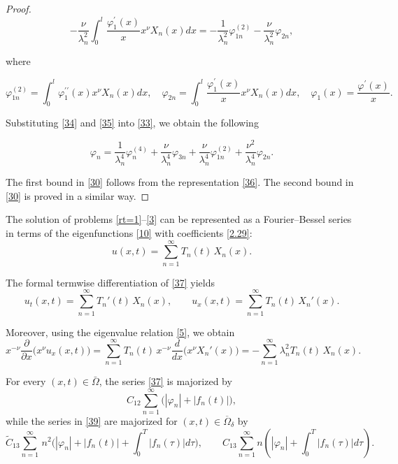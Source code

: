 \documentclass[reqno]{amsart}
\theoremstyle{definition}
\numberwithin{equation}{section}
\begin{document}
\begin{proof}
\begin{equation}\label{35}
    -\frac{\nu}{\lambda_n^2} \int_0^l \frac{\varphi_1^{\prime}(x)}{x} x^\nu X_n(x) d x=-\frac{1}{\lambda_n^2} \varphi_{1 n}^{(2)}-\frac{\nu}{\lambda_n^2} \varphi_{2 n},
\end{equation}

where

$$
\varphi_{1 n}^{(2)}=\int_0^l \varphi_1^{\prime \prime}(x) x^\nu X_n(x) d x, \quad \varphi_{2 n}=\int_0^l \frac{\varphi_1^{\prime}(x)}{x} x^\nu X_n(x) d x, \quad \varphi_1(x)=\frac{\varphi^{\prime}(x)}{x}.
$$


Substituting \eqref{34} and \eqref{35} into \eqref{33}, we obtain the following

\begin{equation}\label{36}
    \varphi_n=\frac{1}{\lambda_n^4} \varphi_n^{(4)}+\frac{\nu}{\lambda_n^4} \varphi_{3 n}+\frac{\nu}{\lambda_n^4} \varphi_{1 n}^{(2)}+\frac{\nu^2}{\lambda_n^4} \varphi_{2 n} .
\end{equation}
 
The first bound in \eqref{30} follows from the representation \eqref{36}. The second bound in \eqref{30} is proved in a similar way. \end{proof} 

The solution of problems \eqref{rt=1}--\eqref{3} can be represented as a
Fourier--Bessel series in terms of the eigenfunctions \eqref{10} with
coefficients \eqref{2.29}:
\begin{equation}\label{37}
u(x,t)=\sum_{n=1}^{\infty}T_n(t)\,X_n(x).
\end{equation}

The formal termwise differentiation of \eqref{37} yields
\begin{equation}\label{39}
u_t(x,t)=\sum_{n=1}^{\infty}T_n'(t)\,X_n(x),\qquad
u_x(x,t)=\sum_{n=1}^{\infty}T_n(t)\,X_n'(x).
\end{equation}

Moreover, using the eigenvalue relation \eqref{5}, we obtain
\begin{equation}\label{opseries}
x^{-\nu}\frac{\partial}{\partial x}\bigl(x^\nu u_x(x,t)\bigr)
=\sum_{n=1}^{\infty}T_n(t)\,
x^{-\nu}\frac{d}{dx}\bigl(x^\nu X_n'(x)\bigr)
=-\sum_{n=1}^{\infty}\lambda_n^2 T_n(t)\,X_n(x).
\end{equation}

For every $(x,t)\in\bar{\Omega}$, the series
\eqref{37} is majorized by
\begin{equation}\label{maj1}
C_{12}\sum_{n=1}^{\infty}\bigl(|\varphi_n|+|f_n(t)|\bigr),
\end{equation}
while the series in \eqref{39} are majorized for $(x,t)\in\overline{\Omega}_\delta$
by
\begin{equation}\label{maj2}
\tilde{C}_{13}\sum_{n=1}^{\infty}\,n^2\big(|\varphi_n|+|f_n(t)|+\int_0^T|f_n(\tau)|d\tau\big), \qquad  C_{13}\sum_{n=1}^{\infty}
n\left(|\varphi_n|+\int_0^T|f_n(\tau)|
d\tau\right).
\end{equation}
\end{document}
